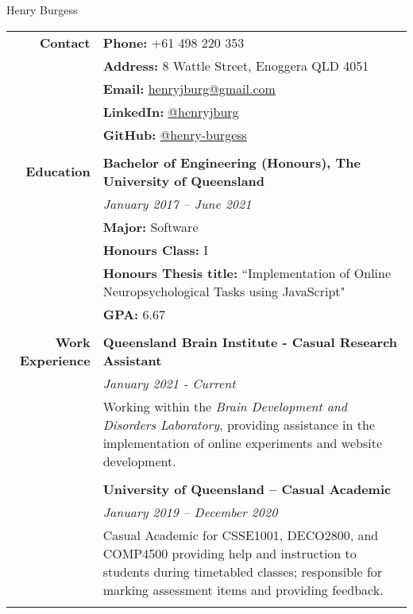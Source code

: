 \documentclass[a4paper]{article}
\begin{document}
\begin{center}
	\Huge{Henry Burgess}
\end{center}

\begin{longtable}{r p{13.5cm}} 
	\textbf{Contact} 		   \vline &	   \textbf{Phone:}  +61 498 220 353 \\ 
										\vline &	\textbf{Address:} 8 Wattle Street, Enoggera QLD 4051 \\
										\vline &	\textbf{Email:} \href{mailto:henryjburg@gmail.com}{henryjburg@gmail.com} \\
										\vline &	\textbf{LinkedIn:} \href{https://www.linkedin.com/in/henryjburg/}{@henryjburg} \\
										\vline &	\textbf{GitHub:} \href{https://github.com/henry-burgess}{@henry-burgess} \\
										\vline & \\
										
	\textbf{Education} 		  \vline & \textbf{Bachelor of Engineering (Honours), The University of Queensland} \\
										\vline & \textit{January 2017 – June 2021} \\
										\vline & \textbf{Major:} Software \\
										\vline & \textbf{Honours Class:} I \\
										\vline & \textbf{Honours Thesis title:} ``Implementation of Online Neuropsychological Tasks using JavaScript" \\
										\vline & \textbf{GPA:} 6.67 \\
										\vline & \\
										
	\textbf{Work Experience} 	  \vline & \textbf{Queensland Brain Institute - Casual Research Assistant} \\
										\vline & \textit{January 2021 - Current} \\
										\vline & Working within the \textit{Brain Development and Disorders Laboratory}, providing assistance in the implementation of online experiments and website development. \\ 
										\vline & \\
	
	 									\vline & \textbf{University of Queensland – Casual Academic} \\
										\vline & \textit{January 2019 – December 2020} \\
										\vline & Casual Academic for CSSE1001, DECO2800, and COMP4500 providing help and instruction to students during timetabled classes; responsible for marking assessment items and providing feedback. \\ 
										\vline & \\
										

\end{longtable}
\end{document}
